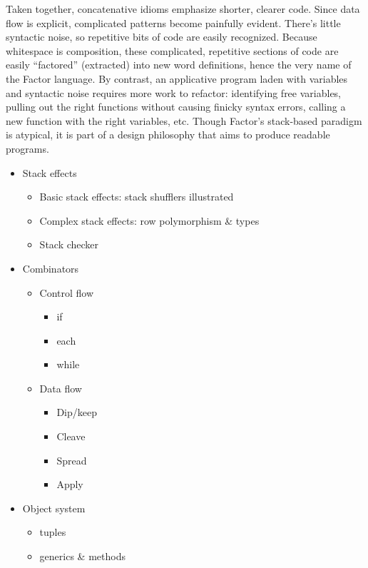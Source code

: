 Taken together, concatenative idioms emphasize shorter, clearer code.  Since
data flow is explicit, complicated patterns become painfully evident.  There's
little syntactic noise, so repetitive bits of code are easily recognized.
Because whitespace is composition, these complicated, repetitive sections of
code are easily ``factored'' (extracted) into new word definitions, hence the
very name of the Factor language.  By contrast, an applicative program laden
with variables and syntactic noise requires more work to refactor: identifying
free variables, pulling out the right functions without causing finicky syntax
errors, calling a new function with the right variables, etc.  Though Factor's
stack-based paradigm is atypical, it is part of a design philosophy that aims
to produce readable programs.

\begin{itemize}

\item Stack effects
      \begin{itemize}
        \item Basic stack effects: stack shufflers illustrated
        \item Complex stack effects: row polymorphism \& types
        \item Stack checker
      \end{itemize}

\item Combinators
      \begin{itemize}
        \item Control flow
              \begin{itemize}
                \item if
                \item each
                \item while
              \end{itemize}
        \item Data flow
              \begin{itemize}
                \item Dip/keep
                \item Cleave
                \item Spread
                \item Apply
              \end{itemize}
      \end{itemize}

\item Object system
      \begin{itemize}
        \item tuples
        \item generics \& methods
      \end{itemize}


\end{itemize}
